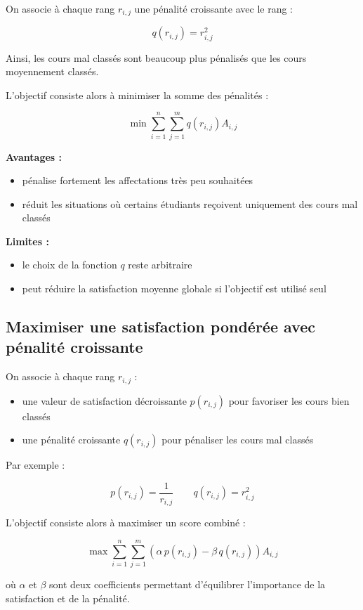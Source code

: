 \documentclass[11pt]{article}
\begin{document}
On associe à chaque rang $r_{i,j}$ une pénalité croissante avec le rang :

\[
q(r_{i,j}) = r_{i,j}^2
\]

Ainsi, les cours mal classés sont beaucoup plus pénalisés que les cours
moyennement classés.

L'objectif consiste alors à minimiser la somme des pénalités :

\[
\min \sum_{i=1}^{n} \sum_{j=1}^{m} q(r_{i,j}) A_{i,j}
\]

\textbf{Avantages :}

\begin{itemize}
\item pénalise fortement les affectations très peu souhaitées
\item réduit les situations où certains étudiants reçoivent uniquement des cours mal classés
\end{itemize}

\textbf{Limites :}

\begin{itemize}
\item le choix de la fonction $q$ reste arbitraire
\item peut réduire la satisfaction moyenne globale si l'objectif est utilisé seul
\end{itemize}

\subsection{Maximiser une satisfaction pondérée avec pénalité croissante}

On associe à chaque rang $r_{i,j}$ :

\begin{itemize}
\item une valeur de satisfaction décroissante $p(r_{i,j})$ pour favoriser les cours bien classés
\item une pénalité croissante $q(r_{i,j})$ pour pénaliser les cours mal classés
\end{itemize}

Par exemple :

\[
p(r_{i,j}) = \frac{1}{r_{i,j}}
\qquad
q(r_{i,j}) = r_{i,j}^2
\]

L'objectif consiste alors à maximiser un score combiné :

\[
\max \sum_{i=1}^{n} \sum_{j=1}^{m}
\left( \alpha \, p(r_{i,j}) - \beta \, q(r_{i,j}) \right) A_{i,j}
\]

où $\alpha$ et $\beta$ sont deux coefficients permettant d'équilibrer
l'importance de la satisfaction et de la pénalité.
\end{document}
